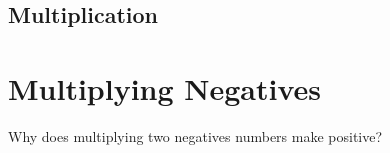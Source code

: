 \section{Multiplication}

\chapter{Multiplying Negatives}

Why does multiplying two negatives numbers make positive?

